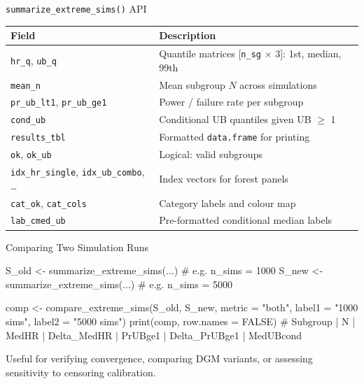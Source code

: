 \documentclass[
  11pt,
  ignorenonframetext,
  aspectratio=169,
]{beamer}
\newenvironment{Shaded}{\begin{snugshade}}{\end{snugshade}}
\newcommand{\AttributeTok}[1]{\textcolor[rgb]{0.40,0.45,0.13}{#1}}
\newcommand{\CommentTok}[1]{\textcolor[rgb]{0.37,0.37,0.37}{#1}}
\newcommand{\ConstantTok}[1]{\textcolor[rgb]{0.56,0.35,0.01}{#1}}
\newcommand{\FunctionTok}[1]{\textcolor[rgb]{0.28,0.35,0.67}{#1}}
\newcommand{\NormalTok}[1]{\textcolor[rgb]{0.00,0.23,0.31}{#1}}
\newcommand{\OtherTok}[1]{\textcolor[rgb]{0.00,0.23,0.31}{#1}}
\newcommand{\StringTok}[1]{\textcolor[rgb]{0.13,0.47,0.30}{#1}}
\begin{document}
\begin{frame}{\texttt{summarize\_extreme\_sims()} API}
\label{summarize_extreme_sims-api}
\footnotesize

\begin{tabular}{lp{8.5cm}}
\toprule
\textbf{Field} & \textbf{Description} \\
\midrule
\texttt{hr\_q}, \texttt{ub\_q} & Quantile matrices [\texttt{n\_sg} $\times$ 3]: 1st, median, 99th \\
\texttt{mean\_n} & Mean subgroup $N$ across simulations \\
\texttt{pr\_ub\_lt1}, \texttt{pr\_ub\_ge1} & Power / failure rate per subgroup \\
\texttt{cond\_ub} & Conditional UB quantiles given UB $\ge$ 1 \\
\texttt{results\_tbl} & Formatted \texttt{data.frame} for printing \\
\texttt{ok}, \texttt{ok\_ub} & Logical: valid subgroups \\
\texttt{idx\_hr\_single}, \texttt{idx\_ub\_combo}, \ldots & Index vectors for forest panels \\
\texttt{cat\_ok}, \texttt{cat\_cols} & Category labels and colour map \\
\texttt{lab\_cmed\_ub} & Pre-formatted conditional median labels \\
\bottomrule
\end{tabular}
\end{frame}

\begin{frame}[fragile]{Comparing Two Simulation Runs}
\label{comparing-two-simulation-runs}
\footnotesize

\begin{Shaded}
\begin{Highlighting}[]
\NormalTok{S\_old }\OtherTok{\textless{}{-}} \FunctionTok{summarize\_extreme\_sims}\NormalTok{(...)   }\CommentTok{\# e.g. n\_sims = 1000}
\NormalTok{S\_new }\OtherTok{\textless{}{-}} \FunctionTok{summarize\_extreme\_sims}\NormalTok{(...)   }\CommentTok{\# e.g. n\_sims = 5000}

\NormalTok{comp }\OtherTok{\textless{}{-}} \FunctionTok{compare\_extreme\_sims}\NormalTok{(S\_old, S\_new,}
                              \AttributeTok{metric =} \StringTok{"both"}\NormalTok{,}
                              \AttributeTok{label1 =} \StringTok{"1000 sims"}\NormalTok{,}
                              \AttributeTok{label2 =} \StringTok{"5000 sims"}\NormalTok{)}
\FunctionTok{print}\NormalTok{(comp, }\AttributeTok{row.names =} \ConstantTok{FALSE}\NormalTok{)}
\CommentTok{\# Subgroup | N | MedHR | Delta\_MedHR | PrUBge1 | Delta\_PrUBge1 | MedUBcond}
\end{Highlighting}
\end{Shaded}

Useful for verifying convergence, comparing DGM variants, or assessing
sensitivity to censoring calibration.
\end{frame}
\end{document}
